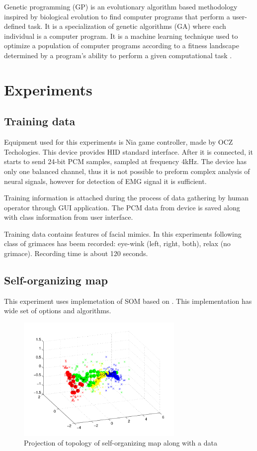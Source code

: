 \documentclass[a4paper]{IEEEtran}
\begin{document}
Genetic programming (GP) is an evolutionary algorithm based methodology 
inspired by biological evolution to find computer programs that perform 
a user-defined task. 
It is a specialization of genetic algorithms (GA) where each 
individual is a computer program. 
It is a machine learning technique used to optimize a population of 
computer programs according to a fitness landscape determined by a 
program's ability to perform a given computational task \cite{gawiki}.


\section{Experiments}
\subsection{Training data}
Equipment used for this experiments is {Nia game controller}, made by 
{OCZ Techologies}. This device provides HID standard interface.
After it is connected, it starts to send 24-bit PCM samples, 
sampled at frequency 4kHz. The device has only one balanced channel, thus 
it is not possible to preform complex analysis of neural signals,
however for detection of EMG signal it is sufficient.

Training information is attached during the process of data gathering by human operator 
through GUI application.
The PCM data from device is saved along with class information from
user interface.

Training data contains features of facial mimics. In this experiments
following class of grimaces has beem recorded: eye-wink (left, right, both), 
relax (no grimace).
Recording time is about 120 seconds. %

\subsection{Self-organizing map}
This experiment uses implemetation of SOM based on \cite{somtoolbox}.
This implementation has wide set of options and algorithms.
\begin{figure}[h]
	\centering
	\includegraphics[width=80mm]{som_topol_proj}
	\caption{Projection of topology of self-organizing map along with a data}
	\label{som_topol_proj}
\end{figure}
\end{document}
